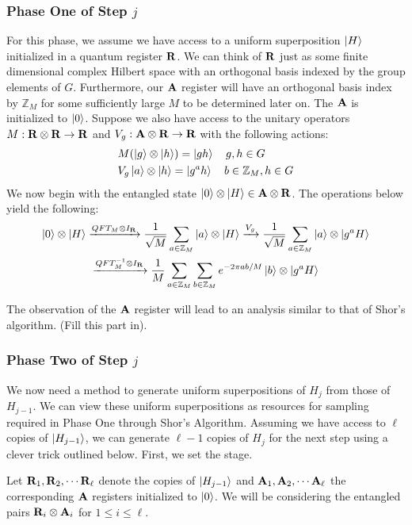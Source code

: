 \subsubsection{Phase One of Step $j$}
For this phase, we assume we have access to a uniform superposition $\ket{H}$ initialized in a quantum register ${\bf R}$. We can think of ${\bf R}$ just as some finite dimensional complex Hilbert space with an orthogonal basis indexed by the group elements of $G$. Furthermore, our ${\bf A}$ register will have an orthogonal basis index by $\mathbb{Z}_M$ for some sufficiently large $M$ to be determined later on. The ${\bf A}$ is initialized to $\ket{0}$.
%
Suppose we also have access to the unitary operators $M: {\bf R} \otimes {\bf R} \rightarrow {\bf R}$ and $V_g: {\bf A} \otimes
{\bf R} \rightarrow {\bf R}$ with the following actions:
%
\begin{align*}
  & M(\ket{g} \otimes \ket{h}) = \ket{gh} \quad g,h \in G \\
  & V_g \ket{a} \otimes \ket{h} = \ket{g^ah} \quad b \in \mathbb{Z}_M, h \in G
\end{align*}
%
We now begin with the entangled state $\ket{0} \otimes \ket{H} \in {\bf A} \otimes {\bf R}$. The operations below yield the following:
%
\begin{gather*}
\ket{0} \otimes \ket{H} \xrightarrow{QFT_{M} \otimes I_{\bf R}} \frac{1}{\sqrt{M}} \sum_{a \in \mathbb{Z}_M} \ket{a} \otimes \ket{H} \xrightarrow{V_g} \frac{1}{\sqrt{M}} \sum_{a \in \mathbb{Z}_M} \ket{a} \otimes \ket{g^aH} \\
\xrightarrow{QFT^{-1}_M \otimes I_{\bf R}} \frac{1}{M}  \sum_{a \in \mathbb{Z}_M} \sum_{b \in \mathbb{Z}_M} e^{-2\pi ab/M}\ket{b} \otimes \ket{g^aH}
\end{gather*}

The observation of the ${\bf A}$ register will lead to an analysis similar to that of Shor's algorithm. (Fill this part in).

\subsubsection{Phase Two of Step $j$}
We now need a method to generate uniform superpositions of $H_j$ from those of $H_{j-1}$. We can view these uniform superpositions as resources for sampling required in Phase One through Shor's Algorithm. Assuming we have access to $\ell$ copies of $\ket{H_{j-1}}$, we can generate $\ell - 1$ copies of $H_{j}$ for the next step using a clever trick outlined below. First, we set the stage.

Let ${\bf R}_1, {\bf R}_2, \cdots {\bf R}_\ell$ denote the copies of $\ket{H_{j-1}}$ and ${\bf A}_1, {\bf A}_2, \cdots {\bf A}_\ell$ the corresponding ${\bf A}$ registers initialized to $\ket{0}$. We will be considering the entangled pairs ${\bf R}_i \otimes {\bf A}_i$ for $1 \leq i \leq \ell$.

